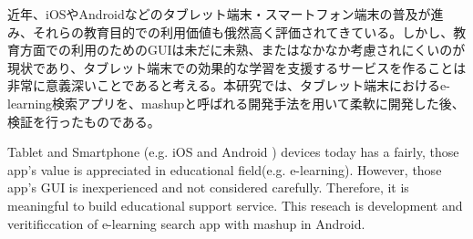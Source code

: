 
\begin{jabstract}
近年、iOSやAndroidなどのタブレット端末・スマートフォン端末の普及が進み、それらの教育目的での利用価値も俄然高く評価されてきている。しかし、教育方面での利用のためのGUIは未だに未熟、またはなかなか考慮されにくいのが現状であり、タブレット端末での効果的な学習を支援するサービスを作ることは非常に意義深いことであると考える。本研究では、タブレット端末におけるe-learning検索アプリを、mashupと呼ばれる開発手法を用いて柔軟に開発した後、検証を行ったものである。
\end{jabstract}

\begin{eabstract}
Tablet and Smartphone (e.g. iOS and Android ) devices today has a fairly, those app's value is appreciated in educational field(e.g. e-learning). However, those app's GUI is inexperienced and not considered carefully. Therefore, it is meaningful to build educational support service. This reseach is development and veritificcation of e-learning search app with mashup in Android.
\end{eabstract}